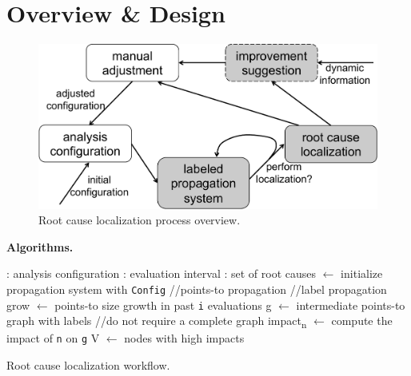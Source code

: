 \section{Overview \& Design}
\label{design}

\begin{figure}[th!]
        \includegraphics[width=0.9\columnwidth]{overview}
\caption{\textmd{Root cause localization process overview.}}
\label{fig:overview}
\end{figure}

{\bf Algorithms.}

\begin{algorithm}[th!]
\begin{algorithmic}[1]
{
\renewcommand{\algorithmicrequire}{\textbf{Input:}}
\renewcommand{\algorithmicensure}{\textbf{Output:}}
: analysis configuration
: evaluation interval
: set of root causes
 $\leftarrow$ initialize propagation system with {\tt Config}
 //points-to propagation
 //label propagation
\ENDFOR
{}
\STATE  grow $\leftarrow$ points-to size growth in past {\tt i} evaluations
\STATE g $\leftarrow$ intermediate points-to graph with labels //do not require a complete graph
\STATE impact\textsubscript{n} $\leftarrow$ compute the impact of {\tt n} on {\tt g}
\ENDFOR
\STATE V $\leftarrow$ nodes with high impacts
\RETURN
\ENDIF
\ENDIF
\ENDWHILE
}
\end{algorithmic}
\caption{Root cause localization workflow.}
\label{alg:localization}
\end{algorithm}

